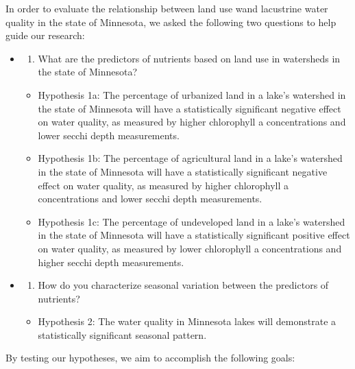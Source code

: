 \documentclass[12pt,]{article}
\providecommand{\tightlist}{%
  \setlength{\itemsep}{0pt}\setlength{\parskip}{0pt}}
\begin{document}
In order to evaluate the relationship between land use wand lacustrine
water quality in the state of Minnesota, we asked the following two
questions to help guide our research:

\begin{itemize}
\item
  \begin{enumerate}
  \def\labelenumi{\arabic{enumi}.}
  \tightlist
  \item
    What are the predictors of nutrients based on land use in watersheds
    in the state of Minnesota?
  \end{enumerate}

  \begin{itemize}
  \tightlist
  \item
    Hypothesis 1a: The percentage of urbanized land in a lake's
    watershed in the state of Minnesota will have a statistically
    significant negative effect on water quality, as measured by higher
    chlorophyll a concentrations and lower secchi depth measurements.
  \item
    Hypothesis 1b: The percentage of agricultural land in a lake's
    watershed in the state of Minnesota will have a statistically
    significant negative effect on water quality, as measured by higher
    chlorophyll a concentrations and lower secchi depth measurements.
  \item
    Hypothesis 1c: The percentage of undeveloped land in a lake's
    watershed in the state of Minnesota will have a statistically
    significant positive effect on water quality, as measured by lower
    chlorophyll a concentrations and higher secchi depth measurements.
  \end{itemize}
\item
  \begin{enumerate}
  \def\labelenumi{\arabic{enumi}.}
  \setcounter{enumi}{1}
  \tightlist
  \item
    How do you characterize seasonal variation between the predictors of
    nutrients?
  \end{enumerate}

  \begin{itemize}
  \tightlist
  \item
    Hypothesis 2: The water quality in Minnesota lakes will demonstrate
    a statistically significant seasonal pattern.
  \end{itemize}
\end{itemize}

By testing our hypotheses, we aim to accomplish the following goals:
\end{document}
